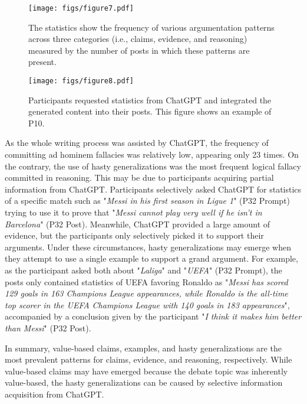 \begin{figure*}
    \centering
    \texttt{[image: figs/figure7.pdf]}
    \caption{The statistics show the frequency of various argumentation patterns across three categories (i.e., claims, evidence, and reasoning) measured by the number of posts in which these patterns are present.}
    \label{fig7}
\end{figure*}

\begin{figure*}
    \centering
    \texttt{[image: figs/figure8.pdf]}
    \caption{Participants requested statistics from ChatGPT and integrated the generated content into their posts. This figure shows an example of P10.}
    \label{fig8}
\end{figure*}

As the whole writing process was assisted by ChatGPT, the frequency of committing ad hominem fallacies was relatively low, appearing only 23 times. On the contrary, the use of hasty generalizations was the most frequent logical fallacy committed in reasoning. This may be due to participants acquiring partial information from ChatGPT. Participants selectively asked ChatGPT for statistics of a specific match such as "\textit{Messi in his first season in Ligue 1}" (P32 Prompt) trying to use it to prove that "\textit{Messi cannot play very well if he isn't in Barcelona}" (P32 Post). Meanwhile, ChatGPT provided a large amount of evidence, but the participants only selectively picked it to support their arguments. Under these circumstances, hasty generalizations may emerge when they attempt to use a single example to support a grand argument. For example, as the participant asked both about "\textit{Laliga}" and "\textit{UEFA}" (P32 Prompt), the posts only contained statistics of UEFA favoring Ronaldo as "\textit{Messi has scored 129 goals in 163 Champions League appearances, while Ronaldo is the all-time top scorer in the UEFA Champions League with 140 goals in 183 appearances}", accompanied by a conclusion given by the participant "\textit{I think it makes him better than Messi}" (P32 Post).

In summary, value-based claims, examples, and hasty generalizations are the most prevalent patterns for claims, evidence, and reasoning, respectively. While value-based claims may have emerged because the debate topic was inherently value-based, the hasty generalizations can be caused by selective information acquisition from ChatGPT.

